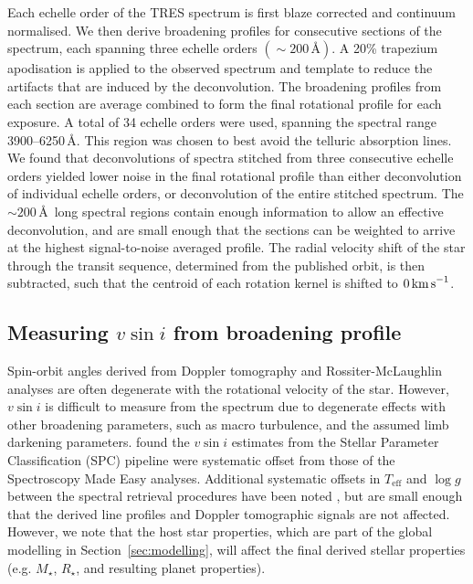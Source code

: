 \documentclass[useAMS,usenatbib]{mn2e}
\newcommand{\teff}{$T_\text{eff}$\xspace}
\newcommand{\logg}{$\log g$\xspace}
\begin{document}
Each echelle order of the TRES spectrum is first blaze corrected and continuum normalised. We then derive broadening profiles for consecutive sections of the spectrum, each spanning three echelle orders $(\sim 200\,\text{\AA})$. A 20\% trapezium apodisation is applied to the observed spectrum and template to reduce the artifacts that are induced by the deconvolution. The broadening profiles from each section are average combined to form the final rotational profile for each exposure. A total of 34 echelle orders were used, spanning the spectral range 3900--6250\,\AA. This region was chosen to best avoid the telluric absorption lines. We found that deconvolutions of spectra stitched from three consecutive echelle orders yielded lower noise in the final rotational profile than either deconvolution of individual echelle orders, or deconvolution of the entire stitched spectrum. The $\sim 200\,$\AA\, long spectral regions contain enough information to allow an effective deconvolution, and are small enough that the sections can be weighted to arrive at the highest signal-to-noise averaged profile. The radial velocity shift of the star through the transit sequence, determined from the published orbit, is then subtracted, such that the centroid of each rotation kernel is shifted to $0\,\text{km\,s}^{-1}$.

\subsection{Measuring $v\sin i$ from broadening profile}
\label{sec:vsini}
Spin-orbit angles derived from Doppler tomography and Rossiter-McLaughlin analyses are often degenerate with the rotational velocity of the star. However, $v \sin i$ is difficult to measure from the spectrum due to degenerate effects with other broadening parameters, such as macro turbulence, and the assumed limb darkening parameters. \citet{2012ApJ...757..161T} found the $v\sin i$ estimates from the Stellar Parameter Classification (SPC) pipeline \citep[used in the discovery papers,] []{2012Natur.486..375B} were systematic offset from those of the Spectroscopy Made Easy \citep[SME][]{1996A&amp;AS..118..595V} analyses. Additional systematic offsets in \teff and \logg between the spectral retrieval procedures have been noted \cite[e.g.][]{2012ApJ...757..161T,2013A&A...558A.106M}, but are small enough that the derived line profiles and Doppler tomographic signals are not affected. However, we note that the host star properties, which are part of the global modelling in Section~\ref{sec:modelling}, will affect the final derived stellar properties (e.g. $M_\star$, $R_\star$, and resulting planet properties). 
\end{document}
